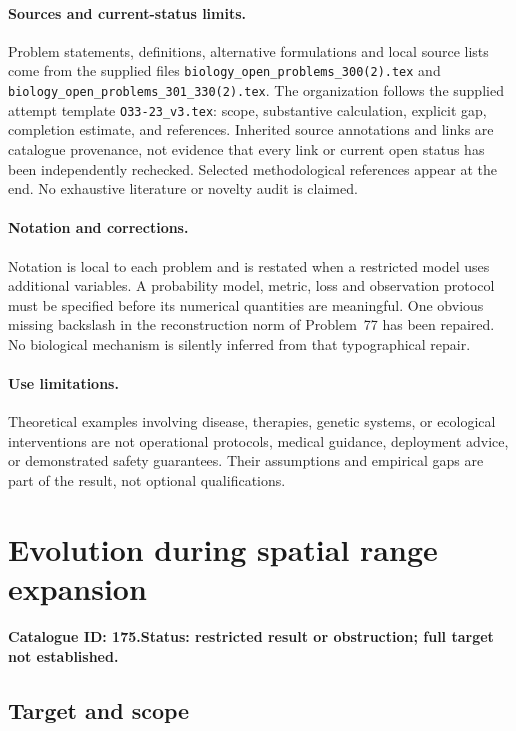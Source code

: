 \documentclass[11pt]{article}
\begin{document}
\paragraph{Sources and current-status limits.}
Problem statements, definitions, alternative formulations and local source lists
come from the supplied files
\texttt{biology\_open\_problems\_300(2).tex} and
\texttt{biology\_open\_problems\_301\_330(2).tex}.
The organization follows the supplied attempt template
\texttt{O33-23\_v3.tex}: scope, substantive calculation, explicit gap,
completion estimate, and references. Inherited source annotations and links are
catalogue provenance, not evidence that every link or current open status has
been independently rechecked. Selected methodological references appear at the
end. No exhaustive literature or novelty audit is claimed.

\paragraph{Notation and corrections.}
Notation is local to each problem and is restated when a restricted model uses
additional variables. A probability model, metric, loss and observation protocol
must be specified before its numerical quantities are meaningful. One obvious
missing backslash in the reconstruction norm of Problem~77 has been repaired.
No biological mechanism is silently inferred from that typographical repair.

\paragraph{Use limitations.}
Theoretical examples involving disease, therapies, genetic systems, or ecological
interventions are not operational protocols, medical guidance, deployment advice,
or demonstrated safety guarantees. Their assumptions and empirical gaps are part
of the result, not optional qualifications.

\setcounter{section}{174}
\section{Evolution during spatial range expansion}
\label{prob:175}
\noindent\textbf{Catalogue ID: 175.}\quad \textbf{Status: restricted result or obstruction; full target not established.}
\subsection{Target and scope}
\end{document}
